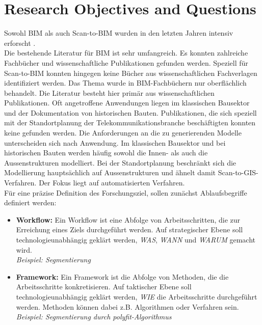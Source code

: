 \section{Research Objectives and Questions}
\begin{German}
    Sowohl BIM als auch Scan-to-BIM wurden in den letzten Jahren intensiv erforscht \cite{rochaSurveyScantoBIMPractices2021}. \\
    Die bestehende Literatur für BIM ist sehr umfangreich. Es konnten zahlreiche Fachbücher und wissenschaftliche Publikationen gefunden werden. Speziell für Scan-to-BIM konnten hingegen keine Bücher aus wissenschaftlichen Fachverlagen identifiziert werden. Das Thema wurde in BIM-Fachbüchern nur oberflächlich behandelt. Die Literatur besteht hier primär aus wissenschaftlichen Publikationen. Oft angetroffene Anwendungen liegen im klassischen Bausektor und der Dokumentation von historischen Bauten. Publikationen, die sich speziell mit der Standortplanung der Telekommunikationsbranche beschäftigten konnten keine gefunden werden. Die Anforderungen an die zu generierenden Modelle unterscheiden sich nach Anwendung. Im klassischen Bausektor und bei historischen Bauten werden häufig sowohl die Innen- als auch die Aussenstrukturen modelliert. Bei der Standortplanung beschränkt sich die Modellierung hauptsächlich auf Aussenstrukturen und ähnelt damit Scan-to-GIS-Verfahren. Der Fokus liegt auf automatisierten Verfahren. \\

    Für eine präzise Definition des Forschungsziel, sollen zunächst Ablaufsbegriffe definiert werden:
    
    \begin{itemize}
        \item \textbf{Workflow:} Ein Workflow ist eine Abfolge von Arbeitsschritten, die zur Erreichung eines Ziels durchgeführt werden. Auf strategischer Ebene soll technologieunabhängig geklärt werden, \textit{WAS}, \textit{WANN} und \textit{WARUM} gemacht wird.\\
        \textit{Beispiel: Segmentierung}

        \item \textbf{Framework:} Ein Framework ist die Abfolge von Methoden, die die Arbeitsschritte konkretisieren. Auf taktischer Ebene soll technologieunabhängig geklärt werden, \textit{WIE} die Arbeitsschritte durchgeführt werden. Methoden können dabei z.B. Algorithmen oder Verfahren sein.\\
        \textit{Beispiel: Segmentierung durch polyfit-Algorithmus}
        

\end{itemize}
\end{German}
